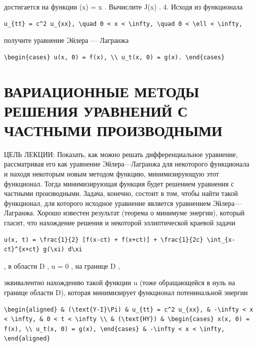 \documentclass[
  ukrainian,
]{article}
\begin{document}
достигается на функции (x) = \sin x . Вычислите J(\sin x) .
4. Исходя из функционала

\begin{verbatim}
u_{tt} = c^2 u_{xx}, \quad 0 < x < \infty, \quad 0 < \ell < \infty,
\end{verbatim}

получите уравнение Эйлера --- Лагранжа

\begin{verbatim}
\begin{cases} u(x, 0) = f(x), \\ u_t(x, 0) = g(x). \end{cases}
\end{verbatim}

\section{ВАРИАЦИОННЫЕ МЕТОДЫ РЕШЕНИЯ УРАВНЕНИЙ С ЧАСТНЫМИ
ПРОИЗВОДНЫМИ}\label{ux432ux430ux440ux438ux430ux446ux438ux43eux43dux43dux44bux435-ux43cux435ux442ux43eux434ux44b-ux440ux435ux448ux435ux43dux438ux44f-ux443ux440ux430ux432ux43dux435ux43dux438ux439-ux441-ux447ux430ux441ux442ux43dux44bux43cux438-ux43fux440ux43eux438ux437ux432ux43eux434ux43dux44bux43cux438}

ЦЕЛЬ ЛЕКЦИИ: Показать, как можно решать дифференциальное уравнение,
рассматривая его как уравнение Эйлера---Лагранжа для некоторого
функционала и находя некоторым новым методом функцию, минимизирующую
этот функционал. Тогда минимизирующая функция будет решением уравнения с
частными производными. Задача, конечно, состоит в том, чтобы найти такой
функционал, для которого исходное уравнение является уравнением
Эйлера---Лагранжа. Хорошо известен результат (теорема о минимуме
энергии), который гласит, что нахождение решения и некоторой
эллиптической краевой задачи

\begin{verbatim}
u(x, t) = \frac{1}{2} [f(x-ct) + f(x+ct)] + \frac{1}{2c} \int_{x-ct}^{x+ct} g(\xi) d\xi
\end{verbatim}

, в области D , u = 0 , на границе D ,

эквивалентно нахождению такой функции u (тоже обращающейся в нуль на
границе области D), которая минимизирует функционал потенинальной
энергии

\begin{verbatim}
\begin{aligned} & (\text{Y-I}\Pi) & u_{tt} = c^2 u_{xx}, & -\infty < x < \infty, & 0 < t < \infty \\ & (\text{HY}) & \begin{cases} x(x, 0) = f(x), \\ u_t(x, 0) = g(x), \end{cases} & -\infty < x < \infty, \end{aligned}
\end{verbatim}
\end{document}
